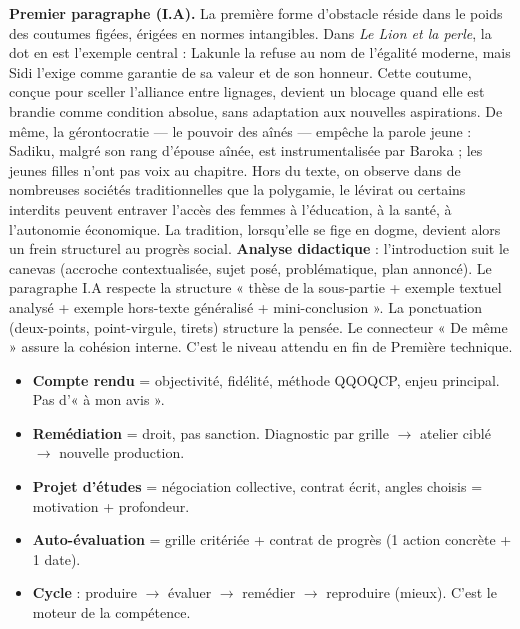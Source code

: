 \documentclass[11pt]{article}
\begin{document}
\begin{exoresolu}
\textbf{Premier paragraphe (I.A).} La première forme d'obstacle réside dans le poids des coutumes figées, érigées en normes intangibles. Dans \emph{Le Lion et la perle}, la dot en est l'exemple central : Lakunle la refuse au nom de l'égalité moderne, mais Sidi l'exige comme garantie de sa valeur et de son honneur. Cette coutume, conçue pour sceller l'alliance entre lignages, devient un blocage quand elle est brandie comme condition absolue, sans adaptation aux nouvelles aspirations. De même, la gérontocratie — le pouvoir des aînés — empêche la parole jeune : Sadiku, malgré son rang d'épouse aînée, est instrumentalisée par Baroka ; les jeunes filles n'ont pas voix au chapitre. Hors du texte, on observe dans de nombreuses sociétés traditionnelles que la polygamie, le lévirat ou certains interdits peuvent entraver l'accès des femmes à l'éducation, à la santé, à l'autonomie économique. La tradition, lorsqu'elle se fige en dogme, devient alors un frein structurel au progrès social.
\tcblower
\textbf{Analyse didactique} : l'introduction suit le canevas (accroche contextualisée, sujet posé, problématique, plan annoncé). Le paragraphe I.A respecte la structure « thèse de la sous-partie + exemple textuel analysé + exemple hors-texte généralisé + mini-conclusion ». La ponctuation (deux-points, point-virgule, tirets) structure la pensée. Le connecteur « De même » assure la cohésion interne. C'est le niveau attendu en fin de Première technique.
\end{exoresolu}

\begin{aretenir}
\begin{itemize}
    \item \textbf{Compte rendu} = objectivité, fidélité, méthode QQOQCP, enjeu principal. Pas d'« à mon avis ».
    \item \textbf{Remédiation} = droit, pas sanction. Diagnostic par grille $\rightarrow$ atelier ciblé $\rightarrow$ nouvelle production.
    \item \textbf{Projet d'études} = négociation collective, contrat écrit, angles choisis = motivation + profondeur.
    \item \textbf{Auto-évaluation} = grille critériée + contrat de progrès (1 action concrète + 1 date).
    \item \textbf{Cycle} : produire $\rightarrow$ évaluer $\rightarrow$ remédier $\rightarrow$ reproduire (mieux). C'est le moteur de la compétence.
\end{itemize}
\end{aretenir}
\end{document}
